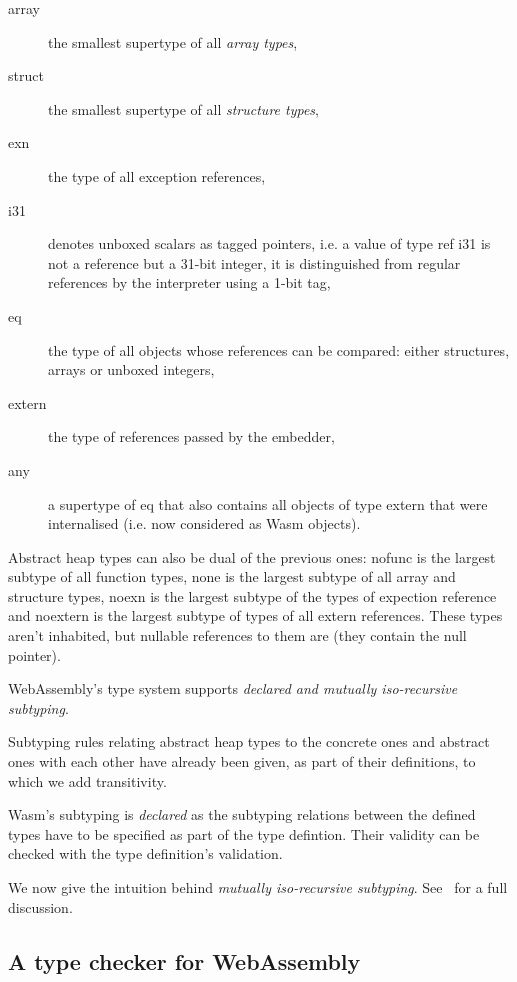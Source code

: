 \documentclass[10pt]{article}
\begin{document}
\begin{description}
\begin{description}
      \item[\textsf{array}] the smallest supertype of all \emph{array types},
      \item[\textsf{struct}] the smallest supertype of all \emph{structure
      types},
      \item[\textsf{exn}] the type of all exception references,
      \item[\textsf{i31}] denotes unboxed scalars as tagged pointers, i.e. a
        value of type \textsf{ref i31} is not a reference but a 31-bit integer,
        it is distinguished from regular references by the interpreter using a
        1-bit tag,
      \item[\textsf{eq}] the type of all objects whose references can be
        compared: either structures, arrays or unboxed integers,
      \item[\textsf{extern}] the type of references passed by the embedder,
      \item[\textsf{any}] a supertype of \textsf{eq} that also contains all
        objects of type \textsf{extern} that were internalised (i.e. now
        considered as Wasm objects).
    \end{description}
    Abstract heap types can also be dual of the previous ones: \textsf{nofunc}
    is the largest subtype of all function types, \textsf{none} is the largest
    subtype of all array and structure types, \textsf{noexn} is the largest
    subtype of the types of expection reference and \textsf{noextern} is the
    largest subtype of types of all extern references. These types aren't
    inhabited, but nullable references to them are (they contain the null
    pointer).

\end{description}

WebAssembly's type system supports \emph{declared and mutually iso-recursive
subtyping}.

Subtyping rules relating abstract heap types to the concrete ones and abstract
ones with each other have already been given, as part of their definitions,
to which we add transitivity.

Wasm's subtyping is \emph{declared} as the subtyping relations between the
defined types have to be specified as part of the type defintion. Their validity
can be checked with the type definition's validation.

We now give the intuition behind \emph{mutually iso-recursive subtyping}.
See~\cite{rossberg2023mutually} for a full discussion.
\subsection{A type checker for WebAssembly}
\end{document}
